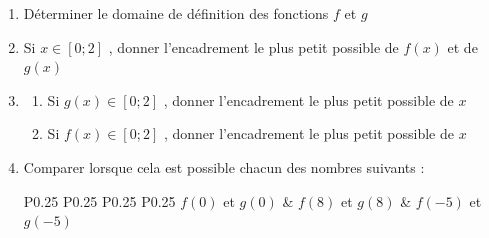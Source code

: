 \documentclass[oneside,12pt]{article}          %
\begin{document}
  \hspace{5mm}
\begin{enumerate}
	\item Déterminer le domaine de définition des fonctions $f$ et $g$
	\item Si $x\in[0;2]$ , donner l'encadrement le plus petit possible de $f(x)$ et de $g(x)$
	\item \begin{enumerate}
		\item Si $g(x)\in[0;2]$ , donner l'encadrement le plus petit possible de $x$
		\item Si $f(x)\in[0;2]$ , donner l'encadrement le plus petit possible de $x$
	\end{enumerate}
	\item Comparer lorsque cela est possible chacun des nombres suivants :
	
	\renewcommand{\arraystretch}{1.5}\hspace{-15mm}
	\begin{tabular}{P{0.25\linewidth} P{0.25\linewidth} P{0.25\linewidth} P{0.25\linewidth}}
		$f(0)$ et $g(0)$ & $f(8)$ et $g(8)$ & $f(-5)$ et $g(-5)$
	\end{tabular}
\end{enumerate}
\end{document}
